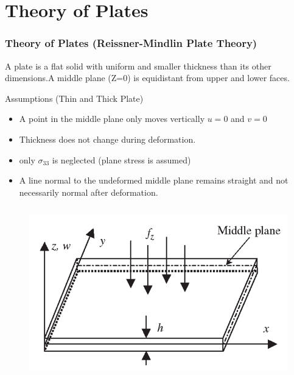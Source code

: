\documentclass[9pt]{beamer}
\begin{document}
\section{Theory of Plates}
\begin{frame}
\frametitle{Theory of Plates (Reissner-Mindlin Plate Theory)}
A plate is a flat solid with uniform and smaller thickness than its other dimensions.A middle plane (Z=0) is equidistant from upper and lower faces.
\begin{block}{Assumptions (Thin and Thick Plate)}
\begin{itemize}
\item A point in the middle plane only moves vertically $u = 0$ and $v = 0 $
\item Thickness does not change during deformation.
\item only $\sigma_{33}$ is neglected (plane stress is assumed)
\item A line normal to the undeformed middle plane remains straight and not necessarily normal after deformation.
\end{itemize}
\end{block}


\begin{columns}
\begin{figure}[h!]
  \includegraphics[width=1\linewidth,trim={0 0 0 1cm},clip]{plate.png}
\end{figure}




\end{columns}
\end{frame}
\end{document}
